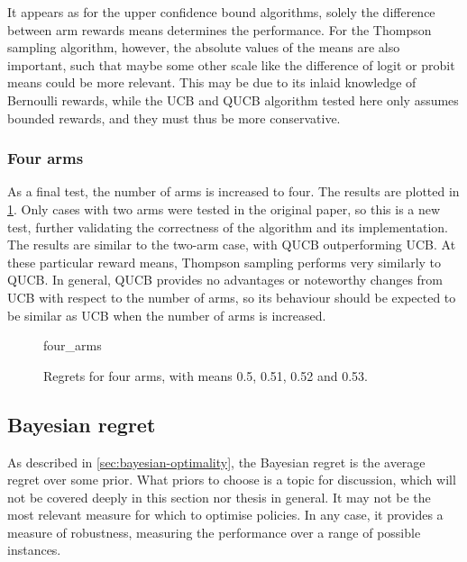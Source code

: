 It appears as for the upper confidence bound algorithms, solely the difference between arm rewards means determines the performance.
For the Thompson sampling algorithm, however, the absolute values of the means are also important, such that maybe some other scale like the difference of logit or probit means could be more relevant.
This may be due to its inlaid knowledge of Bernoulli rewards, while the UCB and QUCB algorithm tested here only assumes bounded rewards, and they must thus be more conservative.

\subsubsection{Four arms}
As a final test, the number of arms is increased to four.
The results are plotted in \cref{fig:four_arms}.
Only cases with two arms were tested in the original paper, so this is a new test, further validating the correctness of the algorithm and its implementation.
The results are similar to the two-arm case, with QUCB outperforming UCB.
At these particular reward means, Thompson sampling performs very similarly to QUCB.
In general, QUCB provides no advantages or noteworthy changes from UCB with respect to the number of arms, so its behaviour should be expected to be similar as UCB when the number of arms is increased.

\begin{figure}
    \centering
    \newcommand{\myoptions}{
        width=10cm,
        height=8cm,
        xlabel={Kiloturn},
        ylabel={Regret},
        legend entries={UCB, QUCB, Thompson},
        legend pos=north west,
        legend cell align=left,
        mystyle,
    }
    {four_arms}
    \caption[
        Regrets for four arms, with means 0.5, 0.51, 0.52 and 0.53.
    ]
    {
        Regrets for four arms, with means 0.5, 0.51, 0.52 and 0.53.
    }
    \label{fig:four_arms}
\end{figure}

\clearpage
\subsection{Bayesian regret}
\label{sec:results_bayesian}
As described in \cref{sec:bayesian-optimality}, the Bayesian regret is the average regret over some prior.
What priors to choose is a topic for discussion, which will not be covered deeply in this section nor thesis in general.
It may not be the most relevant measure for which to optimise policies.
In any case, it provides a measure of robustness, measuring the performance over a range of possible instances.

